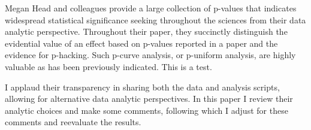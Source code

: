 Megan Head and colleagues provide a large collection of p-values that indicates widespread statistical significance seeking throughout the sciences from their data analytic perspective. Throughout their paper, they succinctly distinguish the evidential value of an effect based on p-values reported in a paper and the evidence for p-hacking. Such p-curve analysis, or p-uniform analysis, are highly valuable as has been previously indicated. This is a test.

I applaud their transparency in sharing both the data and analysis scripts, allowing for alternative data analytic perspectives. In this paper I review their analytic choices and make some comments, following which I adjust for these comments and reevaluate the results.